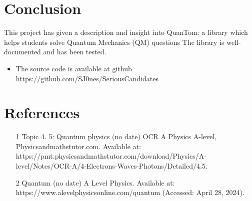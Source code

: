 \documentclass{article}
\begin{document}
\section{Conclusion}
This project has given a description and insight into QuanTom: a library which helps students solve Quantum Mechanics (QM) questions
The library is well-documented and has been tested. 
\begin{itemize}
    \item The source code is available at github https://github.com/SJ0nes/SeriousCandidates
\end{itemize}

\section{References}
\begin{enumerate}
    \item [1] Topic 4. 5: Quantum physics (no date) OCR A Physics A-level, Physicsandmathstutor.com. Available at: https://pmt.physicsandmathstutor.com/download/Physics/A-level/Notes/OCR-A/4-Electrons-Waves-Photons/Detailed/4.5.%
    \item [2] Quantum (no date) A Level Physics. Available at: https://www.alevelphysicsonline.com/quantum (Accessed: April 28, 2024).
\end{enumerate}
\end{document}
